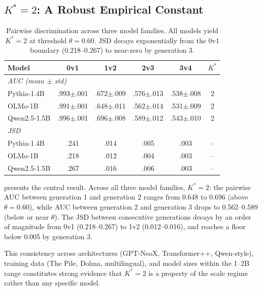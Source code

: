 \documentclass[11pt,a4paper]{article}
\begin{document}
\subsection{$K^*=2$: A Robust Empirical Constant}
\label{sec:kstar}

\begin{table}[t]
\centering
\small
\begin{tabular}{lccccc}
\toprule
\textbf{Model} & \textbf{0v1} & \textbf{1v2} & \textbf{2v3} & \textbf{3v4} & $K^*$ \\
\midrule
\multicolumn{6}{l}{\emph{AUC (mean $\pm$ std)}} \\
Pythia-1.4B & .993\tiny{$\pm$.001} & .672\tiny{$\pm$.009} & .576\tiny{$\pm$.013} & .538\tiny{$\pm$.008} & 2 \\
OLMo-1B & .991\tiny{$\pm$.001} & .648\tiny{$\pm$.011} & .562\tiny{$\pm$.014} & .531\tiny{$\pm$.009} & 2 \\
Qwen2.5-1.5B & .996\tiny{$\pm$.001} & .696\tiny{$\pm$.008} & .589\tiny{$\pm$.012} & .543\tiny{$\pm$.010} & 2 \\
\midrule
\multicolumn{6}{l}{\emph{JSD}} \\
Pythia-1.4B & .241 & .014 & .005 & .003 & -- \\
OLMo-1B & .218 & .012 & .004 & .003 & -- \\
Qwen2.5-1.5B & .267 & .016 & .006 & .003 & -- \\
\bottomrule
\end{tabular}
\caption{Pairwise discrimination across three model families. All models yield $K^*=2$ at threshold $\theta=0.60$. JSD decays exponentially from the 0v1 boundary (0.218--0.267) to near-zero by generation 3.}
\label{tab:kstar_main}
\end{table}

 presents the central result. Across all three model families, $K^*=2$: the pairwise AUC between generation 1 and generation 2 ranges from 0.648 to 0.696 (above $\theta=0.60$), while AUC between generation 2 and generation 3 drops to 0.562--0.589 (below or near $\theta$). The JSD between consecutive generations decays by an order of magnitude from 0v1 (0.218--0.267) to 1v2 (0.012--0.016), and reaches a floor below 0.005 by generation 3.

This consistency across architectures (GPT-NeoX, Transformer++, Qwen-style), training data (The Pile, Dolma, multilingual), and model sizes within the 1--2B range constitutes strong evidence that $K^*=2$ is a property of the scale regime rather than any specific model.
\end{document}
